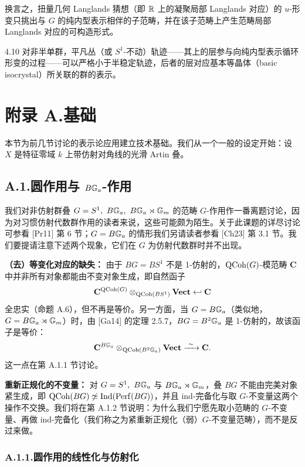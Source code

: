 换言之，扭量几何 Langlands 猜想（即 $\mathbb{R}$ 上的凝聚局部 Langlands 对应）的 $u$-形变只挑出与 $G$ 的纯内型表示相伴的子范畴，并在该子范畴上产生范畴局部 Langlands 对应的可构造形式。

\begin{rem}{4.10}\label{rem:a5-03-4-10}
对非半单群，平凡丛（或 $S^1$-不动）轨迹——其上的层参与向纯内型表示循环形变的过程——可以严格小于半稳定轨迹，后者的层对应基本等晶体（basic isocrystal）所关联的群的表示。
\end{rem}

\section*{附录 A.\quad 基础}

本节为前几节讨论的表示论应用建立技术基础。我们从一个一般的设定开始：设 $X$ 是特征零域 $k$ 上带仿射对角线的光滑 Artin 叠。

\subsection*{A.1.\quad 圆作用与 $B\mathbb{G}_a$-作用}

我们对非仿射群叠 $G=S^1,\ B\GG_a,\ B\GG_a\rtimes\GG_m$ 的范畴 $G$-作用作一番离题讨论，因为对习惯仿射代数群作用的读者来说，这些可能颇为陌生。关于此课题的详尽讨论可参看 [Pr11] 第 6 节；$G=B\mathbb{G}_a$ 的情形我们另请读者参看 [Ch23] 第 3.1 节。我们要提请注意下述两个现象，它们在 $G$ 为仿射代数群时并不出现。

\textbf{（去）等变化对应的缺失：} 由于 $BG=BS^1$ 不是 1-仿射的，$\operatorname{QCoh}(G)$-模范畴 $\mathbf C$ 中并非所有对象都能由不变对象生成，即自然函子
\[
\mathbf C^{\operatorname{QCoh}(G)}\otimes_{\operatorname{QCoh}(BS^1)}\mathbf{Vect}\hookleftarrow\mathbf C
\]
全忠实（命题 A.6），但不再是等价。另一方面，当 $G=B\mathbb{G}_a$（类似地，$G=B\mathbb{G}_a\rtimes\mathbb{G}_m$）时，由 [Ga14] 的定理 2.5.7，$BG=B^2\mathbb{G}_a$ 是 1-仿射的，故该函子是等价：
\[
\mathbf C^{B\GG_a}\otimes_{\QCoh(B^2\GG_a)}\mathbf{Vect}\xrightarrow{\ \sim\ }\mathbf C.
\]
这一点在第 A.1.1 节讨论。


\textbf{重新正规化的不变量：} 对 $G=S^1,\ B\mathbb{G}_a$ 与 $B\mathbb{G}_a\rtimes\mathbb{G}_m$，叠 $BG$ 不能由完美对象紧生成，即 $\operatorname{QCoh}(BG)\not\simeq\operatorname{Ind}(\operatorname{Perf}(BG))$，并且 ind-完备化与取 $G$-不变量这两个操作不交换。我们将在第 A.1.2 节说明：为什么我们宁愿先取小范畴的 $G$-不变量、再做 ind-完备化（我们称之为紧重新正规化（弱）$G$-不变量范畴），而不是反过来做。

\subsubsection*{A.1.1.\quad 圆作用的线性化与仿射化}

